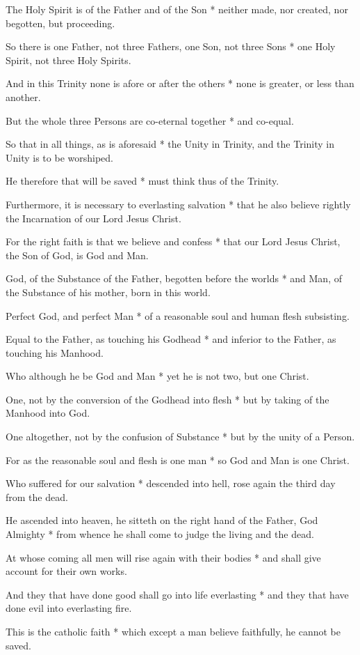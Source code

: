 The Holy Spirit is of the Father and of the Son * neither made, nor created, nor begotten, but proceeding.

So there is one Father, not three Fathers, one Son, not three Sons * one Holy Spirit, not three Holy Spirits.

And in this Trinity none is afore or after the others * none is greater, or less than another.

But the whole three Persons are co-eternal together * and co-equal.

So that in all things, as is aforesaid * the Unity in Trinity, and the Trinity in Unity is to be worshiped.

He therefore that will be saved * must think thus of the Trinity.

Furthermore, it is necessary to everlasting salvation * that he also believe rightly the Incarnation of our Lord Jesus Christ.

For the right faith is that we believe and confess * that our Lord Jesus Christ, the Son of God, is God and Man.

God, of the Substance of the Father, begotten before the worlds * and Man, of the Substance of his mother, born in this world.

Perfect God, and perfect Man * of a reasonable soul and human flesh subsisting.

Equal to the Father, as touching his Godhead * and inferior to the Father, as touching his Manhood.

Who although he be God and Man * yet he is not two, but one Christ.

One, not by the conversion of the Godhead into flesh * but by taking of the Manhood into God.

One altogether, not by the confusion of Substance * but by the unity of a Person.

For as the reasonable soul and flesh is one man * so God and Man is one Christ.

Who suffered for our salvation * descended into hell, rose again the third day from the dead.

He ascended into heaven, he sitteth on the right hand of the Father, God Almighty * from whence he shall come to judge the living and the dead.

At whose coming all men will rise again with their bodies * and shall give account for their own works.

And they that have done good shall go into life everlasting * and they that have done evil into everlasting fire.

This is the catholic faith * which except a man believe faithfully, he cannot be saved.